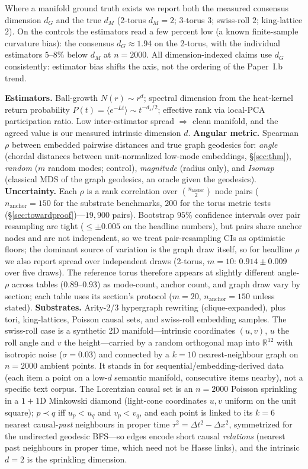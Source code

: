 \documentclass[11pt]{article}
\theoremstyle{remark}
\begin{document}
\noindent Where a manifold ground truth exists we report both the measured
consensus dimension $d_G$ and the true $d_M$ (2-torus $d_M{=}2$; 3-torus $3$;
swiss-roll $2$; king-lattice $2$). On the controls the estimators read a few
percent low (a known finite-sample curvature bias): the consensus
$d_G\approx1.94$ on the 2-torus, with the individual estimators $5$--$8\%$ below
$d_M$ at $n{=}2000$. All dimension-indexed claims use $d_G$ consistently:
estimator bias shifts the axis, not the ordering of the Paper~I.b trend.

\textbf{Estimators.} Ball-growth $N(r)\sim r^d$; spectral dimension from the
heat-kernel return probability $P(t)=\langle e^{-Lt}\rangle\sim t^{-d_s/2}$;
effective rank via local-PCA participation ratio. Low inter-estimator spread
$\Rightarrow$ clean manifold, and the agreed value is our measured intrinsic
dimension $d$. \textbf{Angular metric.} Spearman $\rho$ between embedded pairwise
distances and true graph geodesics for: \emph{angle} (chordal distances
between unit-normalized low-mode
embeddings, \S\ref{sec:thm}), \emph{random} ($m$ random modes; control), \emph{magnitude} (radius
only), and \emph{Isomap} (classical MDS of the graph geodesics, an oracle given the
geodesics). \textbf{Uncertainty.}
Each $\rho$ is a rank correlation over $\binom{n_{\mathrm{anchor}}}{2}$ node pairs
($n_{\mathrm{anchor}}=150$ for the substrate benchmarks, $200$ for the torus
metric tests (\S\ref{sec:towardproof})---$19{,}900$ pairs). Bootstrap
$95\%$ confidence intervals over pair resampling are tight ($\le\pm0.005$ on the
headline numbers), but pairs share anchor nodes and are not independent, so
we treat pair-resampling CIs as optimistic floors; the dominant source of
variation is the graph draw itself, so
for headline $\rho$ we also report spread over independent draws (2-torus,
$m{=}10$: $0.914\pm0.009$ over five draws). The reference torus therefore appears
at slightly different angle-$\rho$ across tables ($0.89$--$0.93$) as mode-count,
anchor count, and graph draw vary by section; each table uses its section's
protocol ($m{=}20$, $n_{\mathrm{anchor}}{=}150$ unless stated).
\textbf{Substrates.} Arity-2/3
hypergraph rewriting (clique-expanded), plus tori, king-lattices, Poisson causal
sets, and swiss-roll embedding samples. The swiss-roll case is a
synthetic 2D manifold---intrinsic coordinates $(u,v)$, $u$ the roll angle and
$v$ the height---carried by a random orthogonal map into $\mathbb{R}^{12}$ with
isotropic noise ($\sigma{=}0.03$) and connected by a $k{=}10$ nearest-neighbour
graph on $n{=}2000$ ambient points. It stands in for sequential/embedding-derived
data (each item a point on a low-$d$ semantic manifold, consecutive items
nearby), not a specific text corpus. The Lorentzian causal set is an
$n{=}2000$ Poisson sprinkling in a $1{+}1$D Minkowski diamond (light-cone
coordinates $u,v$ uniform on the unit square); $p\prec q$ iff $u_p<u_q$ and
$v_p<v_q$, and each point is linked to its $k{=}6$ nearest causal-\emph{past}
neighbours in proper time $\tau^2=\Delta t^2-\Delta x^2$, symmetrized for the
undirected geodesic BFS---so edges encode short causal \emph{relations}
(nearest past neighbours in proper time, which need not be Hasse links), and
the intrinsic $d{=}2$ is the sprinkling dimension.
\end{document}
